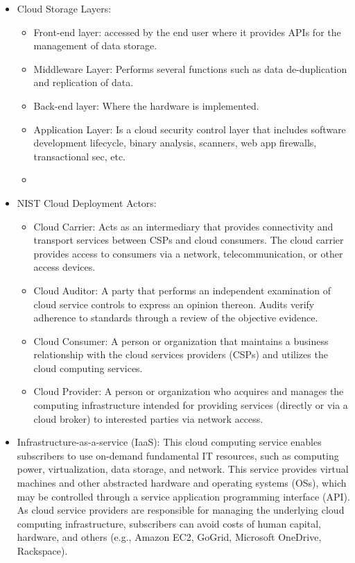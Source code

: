 \begin{itemize}
    \item Cloud Storage Layers:
    \begin{itemize}
        \item Front-end layer: accessed by the end user where it provides APIs for the management of data storage.
        \item Middleware Layer: Performs several functions such as data de-duplication and replication of data.
        \item Back-end layer: Where the hardware is implemented.
        \item Application Layer: Is a cloud security control layer that includes software development lifecycle, binary analysis, scanners, web app firewalls, transactional sec, etc.
        \item 
    \end{itemize}
    \item NIST Cloud Deployment Actors:
    \begin{itemize}
        \item Cloud Carrier: Acts as an intermediary that provides connectivity and transport services between CSPs and cloud consumers. The cloud carrier provides access to consumers via a network, telecommunication, or other access devices.
        \item Cloud Auditor: A party that performs an independent examination of cloud service controls to express an opinion thereon. Audits verify adherence to standards through a review of the objective evidence.
        \item Cloud Consumer: A person or organization that maintains a business relationship with the cloud services providers (CSPs) and utilizes the cloud computing services.
        \item Cloud Provider: A person or organization who acquires and manages the computing infrastructure intended for providing services (directly or via a cloud broker) to interested parties via network access.
    \end{itemize}
    \item Infrastructure-as-a-service (IaaS): This cloud computing service enables subscribers to use on-demand fundamental IT resources, such as computing power, virtualization, data storage, and network. This service provides virtual machines and other abstracted hardware and operating systems (OSs), which may be controlled through a service application programming interface (API). As cloud service providers are responsible for managing the underlying cloud computing infrastructure, subscribers can avoid costs of human capital, hardware, and others (e.g., Amazon EC2, GoGrid, Microsoft OneDrive, Rackspace).

\end{itemize}
